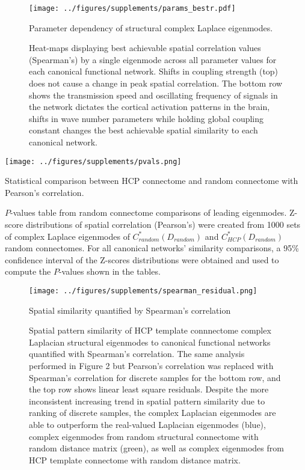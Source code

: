 \begin{figure}[htbp]
\centering
\texttt{[image: ../figures/supplements/params\_bestr.pdf]}
\caption{Parameter dependency of structural complex Laplace eigenmodes.}
\caption*{Heat-maps displaying best achievable spatial correlation values (Spearman's) by a single eigenmode across all parameter values for each canonical functional network. Shifts in coupling strength (top) does not cause a change in peak spatial correlation. The bottom row shows the transmission speed and oscillating frequency of signals in the network dictates the cortical activation patterns in the brain, shifts in wave number parameters while holding global coupling constant changes the best achievable spatial similarity to each canonical network.}
\label{fig:S1}
\end{figure}

\begin{table}[htbp]
\centering
\texttt{[image: ../figures/supplements/pvals.png]}
\caption{Statistical comparison between HCP connectome and random connectome with Pearson's correlation.}
\caption*{$P$-values table from random connectome comparisons of leading eigenmodes. Z-score distributions of spatial correlation (Pearson's) were created from 1000 sets of complex Laplace eigenmodes of  $C_{random}^{*}(D_{random})$ and $C_{HCP}^{*}(D_{random})$ random connectomes. For all canonical networks' similarity comparisons, a 95\% confidence interval of the Z-scores distributions were obtained and used to compute the $P$-values shown in the tables.}
\label{tab:S1}
\end{table}

\begin{figure}[htbp]
\texttt{[image: ../figures/supplements/spearman\_residual.png]}
\caption{Spatial similarity quantified by Spearman's correlation}
\caption*{Spatial pattern similarity of HCP template connnectome complex Laplacian structural eigenmodes to canonical functional networks quantified with Spearman's correlation. The same analysis performed in Figure 2 but Pearson's correlation was replaced with Spearman's correlation for discrete samples for the bottom row, and the top row shows linear least square residuals. Despite the more inconsistent increasing trend in spatial pattern similarity due to ranking of discrete samples, the complex Laplacian eigenmodes are able to outperform the real-valued Laplacian eigenmodes (blue), complex eigenmodes from random structural connectome with random distance matrix (green), as well as complex eigenmodes from HCP template connectome with random distance matrix.}
\label{fig:S2}
\end{figure}

